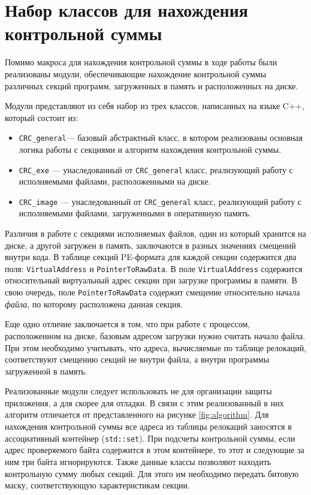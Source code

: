 
\section{Набор классов для нахождения контрольной суммы}

Помимо макроса для нахождения контрольной суммы в ходе работы были реализованы
модули, обеспечивающие нахождение контрольной суммы различных секций программ,
загруженных в память и расположенных на диске.

Модули представляют из себя набор из трех классов, написанных на языке C++,
который состоит из:
\begin{itemize}
  \item \verb!CRC_general!--- базовый абстрактный класс, в котором реализованы
    основная логика работы с секциями и алгоритм нахождения контрольной суммы.
  \item \verb!CRC_exe! --- унаследованный от \verb!CRC_general! класс,
    реализующий работу с исполняемыми файлами, расположенными на диске.
  \item \verb!CRC_image! --- унаследованный от \verb!CRC_general! класс,
    реализующий работу с исполняемыми файлами, загруженными в оперативную
    память.
\end{itemize}

Различия в работе с секциями исполняемых файлов, один из который хранится на
диске, а другой загружен в память, заключаются в разных значениях смещений
внутри кода. В таблице секций PE-формата для каждой секции содержится два поля:
\verb!VirtualAddress! и \verb!PointerToRawData!. В поле \verb!VirtualAddress!
содержится относительный виртуальный адрес секции при загрузке программы в
памяти. В свою очередь, поле \verb!PointerToRawData! содержит смещение
относительно начала \textit{файла}, по которому расположена данная секция.

Еще одно отличие заключается в том, что при работе с процессом, расположенном на
диске, базовым адресом загрузки нужно считать начало файла. При этом
необходимо учитывать, что адреса, вычисляемые по таблице релокаций,
соответствуют смещению секций не внутри файла, а внутри программы загруженной в
память.

Реализованные модули следует использовать не для организации защиты приложения,
а для скорее для отладки. В связи с этим реализованный в них алгоритм отличается
от представленного на рисунке \ref{fig:algorithm}. Для нахождения контрольной
суммы все адреса из таблицы релокаций заносятся в ассоциативный контейнер
(\verb!std::set!). При подсчеты контрольной суммы, если адрес проверяемого байта
содержится в этом контейнере, то этот и следующие за ним три байта игнорируются.
Также данные классы позволяют находить контрольную сумму любых секций. Для этого
им необходимо передать битовую маску, соответствующую характеристикам секции.

